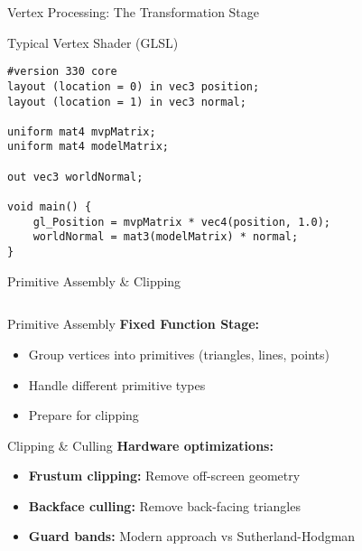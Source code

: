 \begin{frame}[fragile]{Vertex Processing: The Transformation Stage}
  \pause
  \begin{mathbox}{Typical Vertex Shader (GLSL)}
    \footnotesize
        \begin{verbatim}
#version 330 core
layout (location = 0) in vec3 position;
layout (location = 1) in vec3 normal;

uniform mat4 mvpMatrix;
uniform mat4 modelMatrix;

out vec3 worldNormal;

void main() {
    gl_Position = mvpMatrix * vec4(position, 1.0);
    worldNormal = mat3(modelMatrix) * normal;
}
        \end{verbatim}
  \end{mathbox}
\end{frame}

\begin{frame}{Primitive Assembly \& Clipping}
  \begin{columns}
    \begin{column}{0.6\textwidth}
      \begin{conceptbox}{Primitive Assembly}
        \textbf{Fixed Function Stage:}
        \begin{itemize}
          \item Group vertices into primitives (triangles, lines, points)
          \item Handle different primitive types
          \item Prepare for clipping
        \end{itemize}
      \end{conceptbox}

      \vspace{0.3cm}

      \begin{conceptbox}{Clipping \& Culling}
        \textbf{Hardware optimizations:}
        \begin{itemize}
          \item \textbf{Frustum clipping:} Remove off-screen geometry
          \item \textbf{Backface culling:} Remove back-facing triangles
          \item \textbf{Guard bands:} Modern approach vs Sutherland-Hodgman
        \end{itemize}
      \end{conceptbox}
    \end{column}
    \begin{column}{0.4\textwidth}
\end{column}
\end{columns}
\end{frame}

